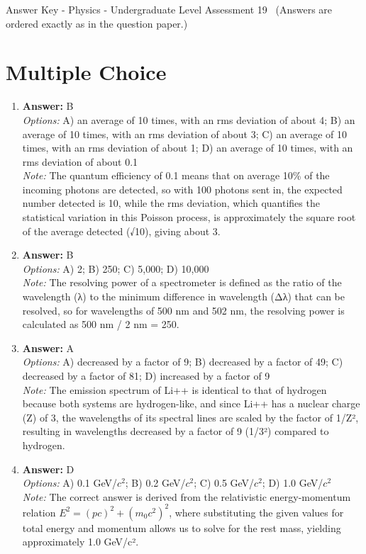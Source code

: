 \documentclass[12pt]{article}
\begin{document}
\begin{center}
Answer Key - Physics - Undergraduate Level Assessment 19 \
\small (Answers are ordered exactly as in the question paper.)
\end{center}

\section*{Multiple Choice}
\begin{enumerate}[label=\arabic*.]
\item \textbf{Answer:} B
\\ \textit{Options:} A) an average of 10 times, with an rms deviation of about 4; B) an average of 10 times, with an rms deviation of about 3; C) an average of 10 times, with an rms deviation of about 1; D) an average of 10 times, with an rms deviation of about 0.1
\\ \textit{Note:} The quantum efficiency of 0.1 means that on average 10\% of the incoming photons are detected, so with 100 photons sent in, the expected number detected is 10, while the rms deviation, which quantifies the statistical variation in this Poisson process, is approximately the square root of the average detected (√10), giving about 3.
\item \textbf{Answer:} B
\\ \textit{Options:} A) 2; B) 250; C) 5,000; D) 10,000
\\ \textit{Note:} The resolving power of a spectrometer is defined as the ratio of the wavelength (λ) to the minimum difference in wavelength (Δλ) that can be resolved, so for wavelengths of 500 nm and 502 nm, the resolving power is calculated as 500 nm / 2 nm = 250.
\item \textbf{Answer:} A
\\ \textit{Options:} A) decreased by a factor of 9; B) decreased by a factor of 49; C) decreased by a factor of 81; D) increased by a factor of 9
\\ \textit{Note:} The emission spectrum of Li++ is identical to that of hydrogen because both systems are hydrogen-like, and since Li++ has a nuclear charge (Z) of 3, the wavelengths of its spectral lines are scaled by the factor of 1/Z², resulting in wavelengths decreased by a factor of 9 (1/3²) compared to hydrogen.
\item \textbf{Answer:} D
\\ \textit{Options:} A) 0.1 GeV/$c^2$; B) 0.2 GeV/$c^2$; C) 0.5 GeV/$c^2$; D) 1.0 GeV/$c^2$
\\ \textit{Note:} The correct answer is derived from the relativistic energy-momentum relation \(E^2 = (pc)^2 + (m_0 c^2)^2\), where substituting the given values for total energy and momentum allows us to solve for the rest mass, yielding approximately 1.0 GeV/c².

\end{enumerate}
\end{document}
